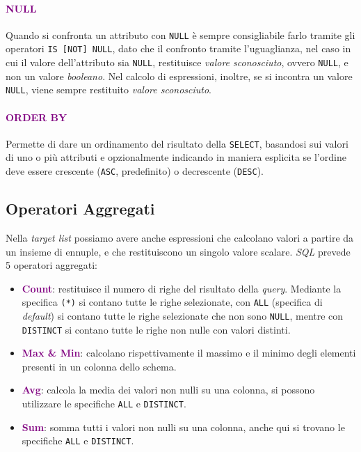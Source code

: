 \paragraph{\textcolor{purple}{NULL}} Quando si confronta un attributo
con \verb|NULL| è sempre consigliabile farlo tramite gli operatori \verb|IS [NOT] NULL|, dato che
il confronto tramite l'uguaglianza, nel caso in cui il valore dell'attributo sia \verb|NULL|, restituisce \emph{valore sconosciuto},
ovvero \verb|NULL|, e non un valore \emph{booleano}.
Nel calcolo di espressioni, inoltre, se si incontra
un valore \verb|NULL|, viene sempre restituito \emph{valore sconosciuto}.

\paragraph{\textcolor{purple}{ORDER BY}} Permette di dare un ordinamento
del risultato della \verb|SELECT|, basandosi sui valori di uno o più attributi e opzionalmente
indicando in maniera esplicita se l'ordine deve essere crescente (\verb|ASC|, predefinito) o decrescente
(\verb|DESC|).

\subsection{Operatori Aggregati}

Nella \emph{target list} possiamo avere anche espressioni che calcolano
valori a partire da un insieme di ennuple, e che restituiscono un singolo valore
scalare. \emph{SQL} prevede 5 operatori aggregati:
\begin{itemize}
    \item \textbf{\textcolor{purple}{Count}}: restituisce il numero di righe del risultato della \emph{query}. Mediante
        la specifica \verb|(*)| si contano tutte le righe selezionate, con \verb|ALL| (specifica di \emph{default}) si contano tutte le righe selezionate che non sono \verb|NULL|,
        mentre con \verb|DISTINCT| si contano tutte le righe non nulle con valori distinti.
    \item \textbf{\textcolor{purple}{Max \& Min}}: calcolano rispettivamente il massimo e il minimo degli elementi presenti
        in un colonna dello schema.
    \item \textbf{\textcolor{purple}{Avg}}: calcola la media dei valori non nulli su una colonna, si possono utilizzare le specifiche \verb|ALL| e \verb|DISTINCT|.
    \item \textbf{\textcolor{purple}{Sum}}: somma tutti i valori non nulli su una colonna, anche qui si trovano le specifiche \verb|ALL| e \verb|DISTINCT|.
\end{itemize}

